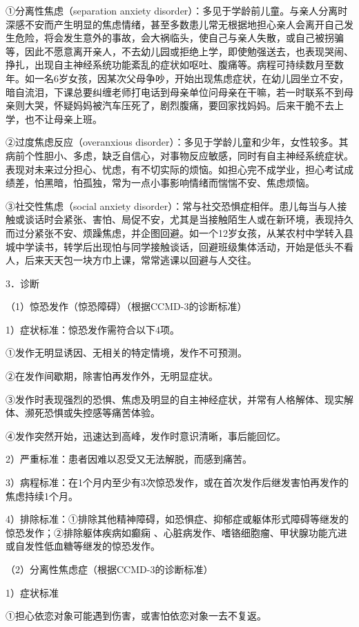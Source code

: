 ①分离性焦虑（separation anxiety
disorder）：多见于学龄前儿童。与亲人分离时深感不安而产生明显的焦虑情绪，甚至多数患儿常无根据地担心亲人会离开自己发生危险，将会发生意外的事故，会大祸临头，使自己与亲人失散，或自己被拐骗等，因此不愿意离开亲人，不去幼儿园或拒绝上学，即使勉强送去，也表现哭闹、挣扎，出现自主神经系统功能紊乱的症状如呕吐、腹痛等。病程可持续数月至数年。如一名6岁女孩，因某次父母争吵，开始出现焦虑症状，在幼儿园坐立不安，暗自流泪，下课总要纠缠老师打电话到母亲单位问母亲在干嘛，若一时联系不到母亲则大哭，怀疑妈妈被汽车压死了，剧烈腹痛，要回家找妈妈。后来干脆不去上学，也不让母亲上班。

②过度焦虑反应（overanxious
disorder）：多见于学龄儿童和少年，女性较多。其病前个性胆小、多虑，缺乏自信心，对事物反应敏感，同时有自主神经系统症状。表现对未来过分担心、忧虑，有不切实际的烦恼。如担心完不成学业，担心考试成绩差，怕黑暗，怕孤独，常为一点小事影响情绪而惴惴不安、焦虑烦恼。

③社交性焦虑（social anxiety
disorder）：常与社交恐惧症相伴。患儿每当与人接触或谈话时会紧张、害怕、局促不安，尤其是当接触陌生人或在新环境，表现持久而过分紧张不安、烦躁焦虑，并企图回避。如一个12岁女孩，从某农村中学转入县城中学读书，转学后出现怕与同学接触谈话，回避班级集体活动，开始是低头不看人，后来天天包一块方巾上课，常常逃课以回避与人交往。

3．诊断

（1）惊恐发作（惊恐障碍）（根据CCMD-3的诊断标准）

1）症状标准：惊恐发作需符合以下4项。

①发作无明显诱因、无相关的特定情境，发作不可预测。

②在发作间歇期，除害怕再发作外，无明显症状。

③发作时表现强烈的恐惧、焦虑及明显的自主神经症状，并常有人格解体、现实解体、濒死恐惧或失控感等痛苦体验。

④发作突然开始，迅速达到高峰，发作时意识清晰，事后能回忆。

2）严重标准：患者因难以忍受又无法解脱，而感到痛苦。

3）病程标准：在1个月内至少有3次惊恐发作，或在首次发作后继发害怕再发作的焦虑持续1个月。

4）排除标准：①排除其他精神障碍，如恐惧症、抑郁症或躯体形式障碍等继发的惊恐发作；②排除躯体疾病如癫痫
、心脏病发作、嗜铬细胞瘤、甲状腺功能亢进或自发性低血糖等继发的惊恐发作。

（2）分离性焦虑症（根据CCMD-3的诊断标准）

1）症状标准

①担心依恋对象可能遇到伤害，或害怕依恋对象一去不复返。

